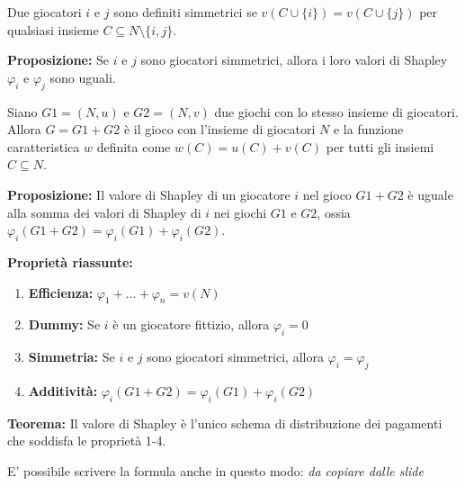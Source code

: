\begin{definition}[Proprietà 3]

    Due giocatori $i$ e $j$ sono definiti simmetrici se $v(C \cup \{i\}) = v(C \cup
        \{j\})$ per qualsiasi insieme $C \subseteq N \setminus \{i, j\}$.

    \textbf{Proposizione:} Se $i$ e $j$ sono giocatori simmetrici, allora i loro valori di Shapley $\varphi_i$ e $\varphi_j$ sono uguali.

\end{definition}

\begin{definition}[Proprietà 4]

    Siano $G1 = (N, u)$ e $G2 = (N, v)$ due giochi con lo stesso insieme di
    giocatori. Allora $G = G1 + G2$ è il gioco con l'insieme di giocatori $N$ e la
    funzione caratteristica $w$ definita come $w(C) = u(C) + v(C)$ per tutti gli
    insiemi $C \subseteq N$.

    \textbf{Proposizione:} Il valore di Shapley di un giocatore $i$ nel gioco $G1 + G2$ è uguale alla somma dei valori di Shapley di $i$ nei giochi $G1$ e $G2$, ossia $\varphi_i(G1 + G2) = \varphi_i(G1) + \varphi_i(G2)$.

\end{definition}

\textbf{Proprietà riassunte:}
\begin{enumerate}
    \item \textbf{Efficienza:} $\varphi_1 + \ldots + \varphi_n = v(N)$
    \item \textbf{Dummy:} Se $i$ è un giocatore fittizio, allora $\varphi_i = 0$
    \item \textbf{Simmetria:} Se $i$ e $j$ sono giocatori simmetrici, allora $\varphi_i = \varphi_j$
    \item \textbf{Additività:} $\varphi_i(G1+G2) = \varphi_i(G1) + \varphi_i(G2)$
\end{enumerate}

\textbf{Teorema:} Il valore di Shapley è l'unico schema di distribuzione dei pagamenti che soddisfa le proprietà 1-4.

E' possibile scrivere la formula anche in questo modo: \textit{da copiare dalle slide}